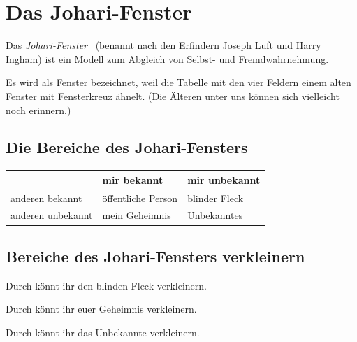 \section{Das Johari-Fenster}
\label{johari-fenster}

Das \emph{Johari-Fenster}~\cite{johari-window, gruppendnamik-einfuehrung} (benannt nach den Erfindern Joseph Luft und Harry Ingham) ist ein Modell zum Abgleich von Selbst- und Fremdwahrnehmung.

Es wird als \glqq Fenster\grqq{} bezeichnet, weil die Tabelle mit den vier Feldern einem alten Fenster mit Fensterkreuz ähnelt. (Die Älteren unter uns können sich vielleicht noch erinnern.)

\subsection{Die Bereiche des Johari-Fensters}

\renewcommand{\arraystretch}{2.0}
\begin{tabular}{p{10em}|p{10em}|p{7em}|}
    & mir bekannt \cellcolor{lightgray} & mir unbekannt \cellcolor{lightgray}
    \\ \hline

    anderen bekannt \cellcolor{lightgray} & öffentliche Person & blinder Fleck
    \\ \hline

    anderen unbekannt \cellcolor{lightgray} & mein Geheimnis & Unbekanntes
    \\ \hline
\end{tabular}
\renewcommand{\arraystretch}{1.0}

\subsection{Bereiche des Johari-Fensters verkleinern}

Durch  könnt ihr den blinden Fleck verkleinern.

Durch  könnt ihr euer Geheimnis verkleinern.

Durch  könnt ihr das Unbekannte verkleinern.

